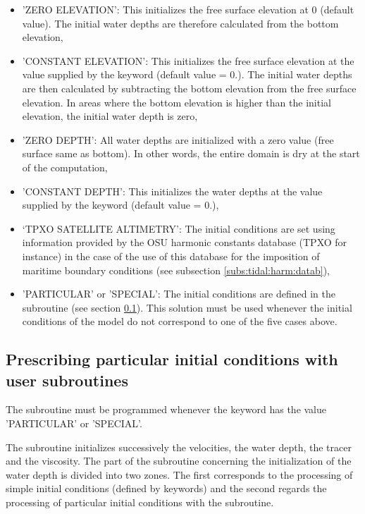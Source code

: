 \begin{itemize}
\item 'ZERO ELEVATION': This initializes the free surface elevation at 0
(default value).
The initial water depths are therefore calculated from the bottom elevation,

\item 'CONSTANT ELEVATION': This initializes the free surface elevation
at the value supplied by the keyword 
(default value = 0.).
The initial water depths are then calculated by subtracting
the bottom elevation from the free surface elevation.
In areas where the bottom elevation is higher than the initial elevation,
the initial water depth is zero,

\item 'ZERO DEPTH': All water depths are initialized with a zero value
(free surface same as bottom).
In other words, the entire domain is dry at the start of the computation,

\item 'CONSTANT DEPTH': This initializes the water depths at the value
supplied by the keyword  (default value = 0.),

\item `TPXO SATELLITE ALTIMETRY': The initial conditions are set using
information provided by the OSU harmonic constants database (TPXO for instance)
in the case of the use of this database for the imposition of maritime boundary
conditions (see subsection \ref{subs:tidal:harm:datab}),

\item 'PARTICULAR' or 'SPECIAL': The initial conditions are defined in the
 subroutine (see section \ref{subs:presc:CONDIN}).
This solution must be used whenever the initial conditions of the model
do not correspond to one of the five cases above.
\end{itemize}


\subsection{Prescribing particular initial conditions with user subroutines}
\label{subs:presc:CONDIN}

The  subroutine must be programmed whenever the keyword
 has the value 'PARTICULAR' or 'SPECIAL'.

The  subroutine initializes successively the velocities,
the water depth, the tracer and the viscosity.
The part of the subroutine concerning the initialization of the water depth
is divided into two zones.
The first corresponds to the processing of simple initial conditions
(defined by keywords)
and the second regards the processing of particular initial conditions
with the  subroutine.

